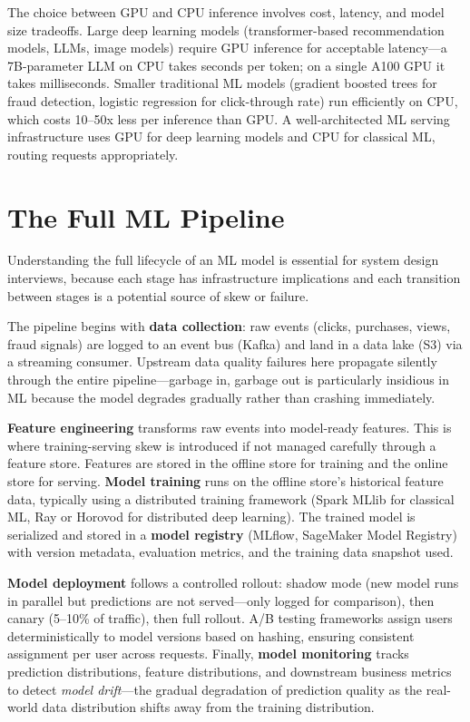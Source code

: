 \documentclass[11pt,a4paper]{article}
\begin{document}
The choice between GPU and CPU inference involves cost, latency, and model size tradeoffs. Large deep learning models (transformer-based recommendation models, LLMs, image models) require GPU inference for acceptable latency---a 7B-parameter LLM on CPU takes seconds per token; on a single A100 GPU it takes milliseconds. Smaller traditional ML models (gradient boosted trees for fraud detection, logistic regression for click-through rate) run efficiently on CPU, which costs 10--50x less per inference than GPU. A well-architected ML serving infrastructure uses GPU for deep learning models and CPU for classical ML, routing requests appropriately.

\section{The Full ML Pipeline}

Understanding the full lifecycle of an ML model is essential for system design interviews, because each stage has infrastructure implications and each transition between stages is a potential source of skew or failure.

The pipeline begins with \textbf{data collection}: raw events (clicks, purchases, views, fraud signals) are logged to an event bus (Kafka) and land in a data lake (S3) via a streaming consumer. Upstream data quality failures here propagate silently through the entire pipeline---garbage in, garbage out is particularly insidious in ML because the model degrades gradually rather than crashing immediately.

\textbf{Feature engineering} transforms raw events into model-ready features. This is where training-serving skew is introduced if not managed carefully through a feature store. Features are stored in the offline store for training and the online store for serving. \textbf{Model training} runs on the offline store's historical feature data, typically using a distributed training framework (Spark MLlib for classical ML, Ray or Horovod for distributed deep learning). The trained model is serialized and stored in a \textbf{model registry} (MLflow, SageMaker Model Registry) with version metadata, evaluation metrics, and the training data snapshot used.

\textbf{Model deployment} follows a controlled rollout: shadow mode (new model runs in parallel but predictions are not served---only logged for comparison), then canary (5--10\% of traffic), then full rollout. A/B testing frameworks assign users deterministically to model versions based on hashing, ensuring consistent assignment per user across requests. Finally, \textbf{model monitoring} tracks prediction distributions, feature distributions, and downstream business metrics to detect \textit{model drift}---the gradual degradation of prediction quality as the real-world data distribution shifts away from the training distribution.
\end{document}
